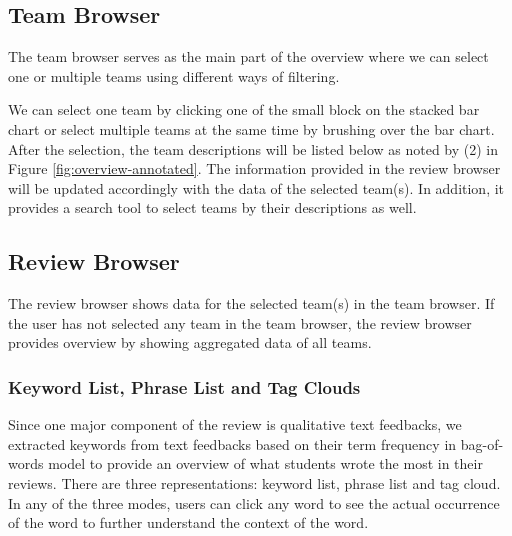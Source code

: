 \documentclass{sigchi}
\begin{document}
\subsection{Team Browser}
The team browser serves as the main part of the overview
where we can select one or multiple teams using different ways of filtering.

We can select one team by clicking one of the small block on the stacked bar
chart or select multiple teams at the same time by brushing over the bar chart.
After the selection, the team descriptions will be listed below as noted by (2)
in Figure \ref{fig:overview-annotated}. The information provided in the review
browser will be updated accordingly with the data of the selected team(s). In
addition, it provides a search tool to select teams by their descriptions as
well.



\subsection{Review Browser}

The review browser shows data for the selected team(s) in the team browser. If
the user has not selected any team in the team browser, the review browser provides overview by showing aggregated data of all teams.

\subsubsection{Keyword List, Phrase List and Tag Clouds}

Since one major component of the review is qualitative text feedbacks,
we extracted keywords from text feedbacks based on their term frequency in bag-of-
words model \cite{bag-of-words} to provide an overview of what students
wrote the most in their reviews.
There are three representations: keyword list, phrase list and tag cloud.
In any of the three modes, users can click any word to see the actual occurrence of the word to further understand the context of the word.
\end{document}
